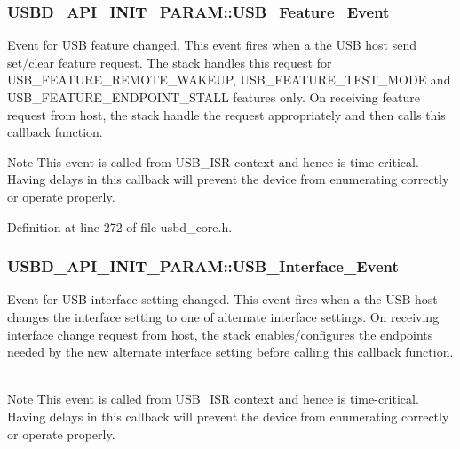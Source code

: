 \subsubsection[{\texorpdfstring{U\+S\+B\+\_\+\+Feature\+\_\+\+Event}{USB_Feature_Event}}]{ U\+S\+B\+D\+\_\+\+A\+P\+I\+\_\+\+I\+N\+I\+T\+\_\+\+P\+A\+R\+A\+M\+::\+U\+S\+B\+\_\+\+Feature\+\_\+\+Event}\hypertarget{structUSBD__API__INIT__PARAM_a785b92610b9c3430e50123ffd8a0497b}{}\label{structUSBD__API__INIT__PARAM_a785b92610b9c3430e50123ffd8a0497b}
Event for U\+SB feature changed. This event fires when a the U\+SB host send set/clear feature request. The stack handles this request for U\+S\+B\+\_\+\+F\+E\+A\+T\+U\+R\+E\+\_\+\+R\+E\+M\+O\+T\+E\+\_\+\+W\+A\+K\+E\+UP, U\+S\+B\+\_\+\+F\+E\+A\+T\+U\+R\+E\+\_\+\+T\+E\+S\+T\+\_\+\+M\+O\+DE and U\+S\+B\+\_\+\+F\+E\+A\+T\+U\+R\+E\+\_\+\+E\+N\+D\+P\+O\+I\+N\+T\+\_\+\+S\+T\+A\+LL features only. On receiving feature request from host, the stack handle the request appropriately and then calls this callback function. ~\newline
 \begin{DoxyNote}{Note}
This event is called from U\+S\+B\+\_\+\+I\+SR context and hence is time-\/critical. Having delays in this callback will prevent the device from enumerating correctly or operate properly. 
\end{DoxyNote}


Definition at line 272 of file usbd\+\_\+core.\+h.

\subsubsection[{\texorpdfstring{U\+S\+B\+\_\+\+Interface\+\_\+\+Event}{USB_Interface_Event}}]{ U\+S\+B\+D\+\_\+\+A\+P\+I\+\_\+\+I\+N\+I\+T\+\_\+\+P\+A\+R\+A\+M\+::\+U\+S\+B\+\_\+\+Interface\+\_\+\+Event}\hypertarget{structUSBD__API__INIT__PARAM_a8582d6606f3154437b513800a6bff4c9}{}\label{structUSBD__API__INIT__PARAM_a8582d6606f3154437b513800a6bff4c9}
Event for U\+SB interface setting changed. This event fires when a the U\+SB host changes the interface setting to one of alternate interface settings. On receiving interface change request from host, the stack enables/configures the endpoints needed by the new alternate interface setting before calling this callback function. ~\newline
 \begin{DoxyNote}{Note}
This event is called from U\+S\+B\+\_\+\+I\+SR context and hence is time-\/critical. Having delays in this callback will prevent the device from enumerating correctly or operate properly. 
\end{DoxyNote}


